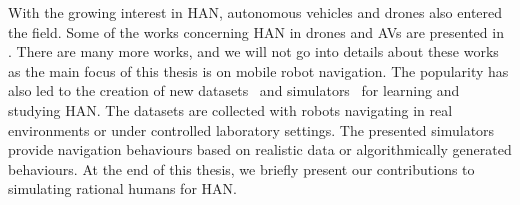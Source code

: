 With the growing interest in HAN, autonomous vehicles and drones also entered the field. Some of the works concerning HAN in drones and AVs are presented in \cite{evens2022learning, luo2018porca, garza2016social, garrell2019teaching}. There are many more works, and we will not go into details about these works as the main focus of this thesis is on mobile robot navigation. The popularity has also led to the creation of new datasets~\cite{rudenko2020thor, karnan2022socially, manso2020socnav1,othman2020srin} and simulators~\cite{mizuchi2017cloud, tsoi2020sean, holtz2021socialgym, biswas2022socnavbench} for learning and studying HAN. The datasets are collected with robots navigating in real environments or under controlled laboratory settings. The presented simulators provide navigation behaviours based on realistic data or algorithmically generated behaviours. At the end of this thesis, we briefly present our contributions to simulating rational humans for HAN.

